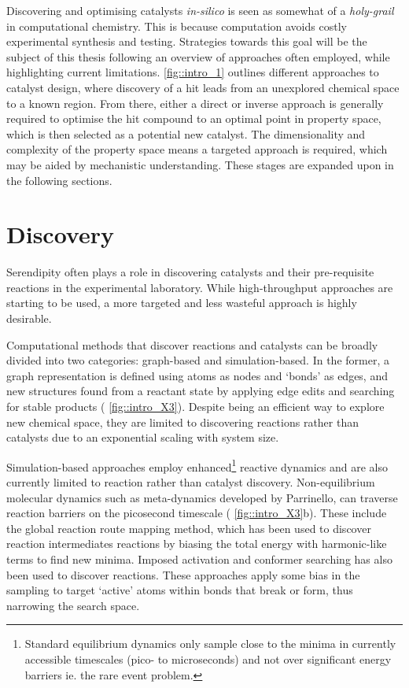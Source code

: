 \documentclass[../main.tex]{subfiles}
\begin{document}
Discovering and optimising catalysts \emph{in-silico} is seen as somewhat of a \emph{holy-grail} in computational chemistry.\cite{Poree2017} This is because computation avoids costly experimental synthesis and testing. Strategies towards this goal will be the subject of this thesis following an overview of approaches often employed, while highlighting current limitations. \figurename{ \ref{fig::intro_1}} outlines different approaches to catalyst design, where discovery of a hit leads from an unexplored chemical space to a known region. From there, either a direct or inverse approach is generally required to optimise the hit compound to an optimal point in property space, which is then selected as a potential new catalyst. The dimensionality and complexity of the property space means a targeted approach is required, which may be aided by mechanistic understanding. These stages are expanded upon in the following sections.


\section{Discovery}

Serendipity often plays a role in discovering catalysts and their pre-requisite reactions in the experimental laboratory.\cite{Nicolaou2014, McNally2011} While high-throughput approaches are starting to be used,\cite{McNally2011, Troshin2017, Ahneman2018} a more targeted and less wasteful approach is highly desirable.

Computational methods that discover reactions and catalysts can be broadly divided into two categories: graph-based and simulation-based.\cite{Meisner2019, Dewyer2017} In the former, a graph representation is defined using atoms as  nodes and `bonds' as edges, and new structures found from a reactant state by applying edge edits and searching for stable products (\figurename{ \ref{fig::intro_X3}}).\cite{Habershon2016, Ismail2019, Robertson2019, Kim2018, Lee2020pccp, McDermott2021} Despite being an efficient way to explore new chemical space, they are limited to discovering reactions rather than catalysts due to an exponential scaling with system size.

Simulation-based approaches employ enhanced\footnote{Standard equilibrium dynamics only sample close to the minima in currently accessible timescales (pico- to microseconds) and not over significant energy barriers ie. the rare event problem.\cite{Gerardo2009}} reactive dynamics and are also currently limited to reaction rather than catalyst discovery. Non-equilibrium molecular dynamics\cite{Yang2019} such as meta-dynamics developed by Parrinello,\cite{Laio2002} can traverse reaction barriers on the picosecond timescale (\figurename{ \ref{fig::intro_X3}}b). These include the global reaction route mapping method,\cite{Maeda2013} which has been used to discover reaction intermediates\cite{Uematsu2015, Yoshimura2017} reactions by biasing the total energy with harmonic-like terms to find new minima. Imposed activation and conformer searching has also been used to discover reactions.\cite{Lavigne2020} These approaches apply some bias in the sampling to target `active' atoms within bonds that break or form, thus narrowing the search space. 
\end{document}
